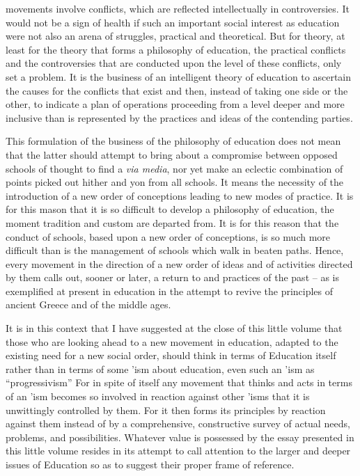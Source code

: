 
 movements involve conflicts, which are reflected intellectually in 
controversies. It would not be a sign of health if such an important social interest as 
education were not also an arena of struggles, practical and theoretical. But for theory, at 
least for the theory that forms a philosophy of education, the practical conflicts and the 
controversies that are conducted upon the level of these conflicts, only set a problem. It is 
the business of an intelligent theory of education to ascertain the causes for the conflicts 
that exist and then, instead of taking one side or the other, to indicate a plan of operations 
proceeding from a level deeper and more inclusive than is represented by the practices 
and ideas of the contending parties. 

This formulation of the business of the philosophy of education does not mean that the 
latter should attempt to bring about a compromise between opposed schools of thought to 
find a \textit{via media}, nor yet make an eclectic combination of points picked out hither and 
yon from all schools. It means the necessity of the introduction of a new order of 
conceptions leading to new modes of practice. It is for this mason that it is so difficult to 
develop a philosophy of education, the moment tradition and custom are departed from. It 
is for this reason that the conduct of schools, based upon a new order of conceptions, is 
so much more difficult than is the management of schools which walk in beaten paths. 
Hence, every movement in the direction of a new order of ideas and of activities directed 
by them calls out, sooner or later, a return to and practices of the past -- as is exemplified 
at present in education in the attempt to revive the principles of ancient Greece and of the 
middle ages. 

It is in this context that I have suggested at the close of this little volume that those 
who are looking ahead to a new movement in education, adapted to the existing need for 
a new social order, should think in terms of Education itself rather than in terms of some 
'ism about education, even such an 'ism as \enquote{progressivism} For in spite of itself any 
movement that thinks and acts in terms of an 'ism becomes so involved in reaction 
against other 'isms that it is unwittingly controlled by them. For it then forms its 
principles by reaction against them instead of by a comprehensive, constructive survey of 
actual needs, problems, and possibilities. Whatever value is possessed by the essay 
presented in this little volume resides in its attempt to call attention to the larger and 
deeper issues of Education so as to suggest their proper frame of reference. 

\noindent
{}